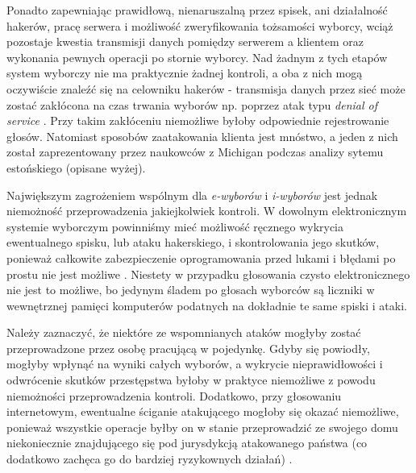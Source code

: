 \documentclass[polish]{kbk}
\begin{document}
Ponadto zapewniając prawidłową, nienaruszalną przez spisek, ani działalność hakerów, pracę serwera i możliwość zweryfikowania tożsamości wyborcy, wciąż pozostaje kwestia transmisji danych pomiędzy serwerem a klientem oraz wykonania pewnych operacji po stornie wyborcy. Nad żadnym z tych etapów system wyborczy nie ma praktycznie żadnej kontroli, a oba z nich mogą oczywiście znaleźć się na celowniku hakerów - transmisja danych przez sieć może zostać zakłócona na czas trwania wyborów np. poprzez atak typu \textit{denial of service} \cite{google}. Przy takim zakłóceniu niemożliwe byłoby odpowiednie rejestrowanie głosów. Natomiast sposobów zaatakowania klienta jest mnóstwo, a jeden z nich został zaprezentowany przez naukowców z Michigan podczas analizy sytemu estońskiego (opisane wyżej).

Największym zagrożeniem wspólnym dla \textit{e-wyborów} i \textit{i-wyborów} jest jednak niemożność przeprowadzenia jakiejkolwiek kontroli. W dowolnym elektronicznym systemie wyborczym powinniśmy mieć możliwość ręcznego wykrycia ewentualnego spisku, lub ataku hakerskiego, i skontrolowania jego skutków, ponieważ całkowite zabezpieczenie oprogramowania przed lukami i błędami po prostu nie jest możliwe \cite{why-hard}. Niestety w przypadku głosowania czysto elektronicznego nie jest to możliwe, bo jedynym śladem po głosach wyborców są liczniki w wewnętrznej pamięci komputerów podatnych na dokładnie te same spiski i ataki.

Należy zaznaczyć, że niektóre ze wspomnianych ataków mogłyby zostać przeprowadzone przez osobę pracującą w pojedynkę. Gdyby się powiodły, mogłyby wpłynąć na wyniki całych wyborów, a wykrycie nieprawidłowości i odwrócenie skutków przestępstwa byłoby w praktyce niemożliwe z powodu niemożności przeprowadzenia kontroli. Dodatkowo, przy głosowaniu internetowym, ewentualne ściganie atakującego mogłoby się okazać niemożliwe, ponieważ wszystkie operacje byłby on w stanie przeprowadzić ze swojego domu niekoniecznie znajdującego się pod jurysdykcją atakowanego państwa (co dodatkowo zachęca go do bardziej ryzykownych działań) \cite{google}.
\end{document}
